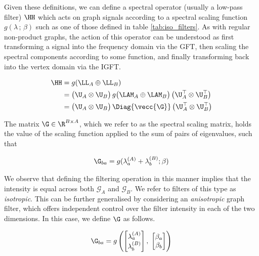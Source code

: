 Given these definitions, we can define a spectral operator (usually a low-pass filter) $\HH$ which acts on graph signals according to a spectral scaling function $g(\lambda \,; \, \beta)$ such as one of those defined in table \ref{tab:iso_filters}. As with regular non-product graphs, the action of this operator can be understood as first transforming a signal into the frequency domain via the GFT, then scaling the spectral components according to some function, and finally transforming back into the vertex domain via the IGFT.

\begin{align}
    \label{eq:graph_filter}
    \HH & = g(\LL_A \oplus \LL_B) \notag                                                                                          \\
        & = \big( \U_A \otimes \U_B \big) \, g \big( \LAM_A \oplus \LAM_B \big) \, \big( \U_A^\top \otimes \U_B^\top \big) \notag \\
        & = \big( \U_A \otimes \U_B \big) \, \Diag{\vecc{\G}} \, \big( \U_A^\top \otimes \U_B^\top \big)
\end{align}


The matrix $\G \in \R^{B \times A}$, which we refer to as the spectral scaling matrix, holds the value of the scaling function applied to the sum of
pairs of eigenvalues, such that

\begin{equation}
    \label{eq:Gba}
    \G_{ba} = g(\lambda^{(A)}_a + \lambda^{(B)}_b; \beta)
\end{equation}



We observe that defining the filtering operation in this manner implies that the intensity is equal across both $\mathcal{G}_A$ and $\mathcal{G}_B$. We refer to filters of this type as \textit{isotropic}. This can be further generalised by considering an \textit{anisotropic} graph filter, which offers independent control over the filter intensity in each of the two dimensions. In this case, we define $\G$ as follows.

\begin{equation}
    \label{eq:Gba2}
    \G_{ba} =  g \left( \begin{bmatrix}
            \lambda^{(A)}_a \\ \lambda^{(B)}_b
        \end{bmatrix}, \; \begin{bmatrix}
            \beta_a \\ \beta_b
        \end{bmatrix} \right)
\end{equation}

